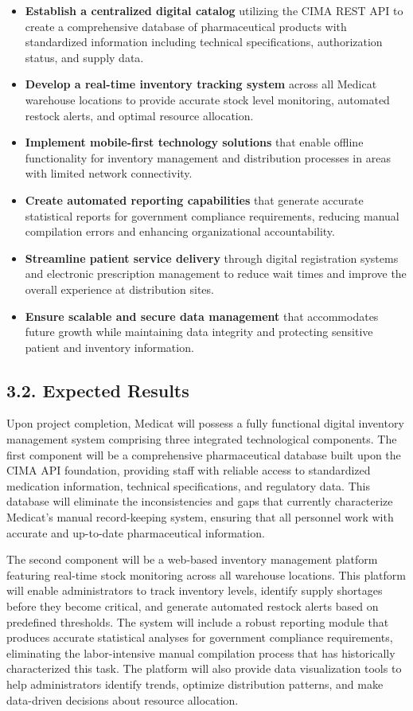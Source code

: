 \documentclass[
]{report}
\begin{document}
\begin{itemize}
\item
  \textbf{Establish a centralized digital catalog} utilizing the CIMA
  REST API to create a comprehensive database of pharmaceutical products
  with standardized information including technical specifications,
  authorization status, and supply data.
\item
  \textbf{Develop a real-time inventory tracking system} across all
  Medicat warehouse locations to provide accurate stock level
  monitoring, automated restock alerts, and optimal resource allocation.
\item
  \textbf{Implement mobile-first technology solutions} that enable
  offline functionality for inventory management and distribution
  processes in areas with limited network connectivity.
\item
  \textbf{Create automated reporting capabilities} that generate
  accurate statistical reports for government compliance requirements,
  reducing manual compilation errors and enhancing organizational
  accountability.
\item
  \textbf{Streamline patient service delivery} through digital
  registration systems and electronic prescription management to reduce
  wait times and improve the overall experience at distribution sites.
\item
  \textbf{Ensure scalable and secure data management} that accommodates
  future growth while maintaining data integrity and protecting
  sensitive patient and inventory information.
\end{itemize}

\subsection{3.2. Expected Results}\label{expected-results}

Upon project completion, Medicat will possess a fully functional digital
inventory management system comprising three integrated technological
components. The first component will be a comprehensive pharmaceutical
database built upon the CIMA API foundation, providing staff with
reliable access to standardized medication information, technical
specifications, and regulatory data. This database will eliminate the
inconsistencies and gaps that currently characterize Medicat's manual
record-keeping system, ensuring that all personnel work with accurate
and up-to-date pharmaceutical information.

The second component will be a web-based inventory management platform
featuring real-time stock monitoring across all warehouse locations.
This platform will enable administrators to track inventory levels,
identify supply shortages before they become critical, and generate
automated restock alerts based on predefined thresholds. The system will
include a robust reporting module that produces accurate statistical
analyses for government compliance requirements, eliminating the
labor-intensive manual compilation process that has historically
characterized this task. The platform will also provide data
visualization tools to help administrators identify trends, optimize
distribution patterns, and make data-driven decisions about resource
allocation.
\end{document}
